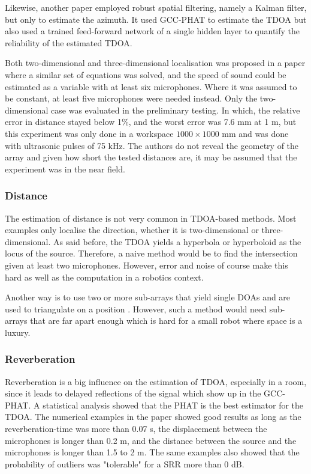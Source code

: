 \documentclass{report}
\begin{document}
Likewise, another paper \cite{kim_robust_2008} employed robust spatial filtering, namely a Kalman filter, but only to estimate the azimuth. It used GCC-PHAT to estimate the TDOA but also used a trained feed-forward network of a single hidden layer to quantify the reliability of the estimated TDOA. 

Both two-dimensional and three-dimensional localisation was proposed in a paper \cite{mahajan_3d_2001} where a similar set of equations was solved, and the speed of sound could be estimated as a variable with at least six microphones. Where it was assumed to be constant, at least five microphones were needed instead. Only the two-dimensional case was evaluated in the preliminary testing. In which, the relative error in distance stayed below 1\%, and the worst error was 7.6 \si{mm} at 1 \si{m}, but this experiment was only done in a workspace $1000\times 1000$ \si{mm} and was done with ultrasonic pulses of 75 \si{kHz}. The authors do not reveal the geometry of the array and given how short the tested distances are, it may be assumed that the experiment was in the near field.

\subsubsection{Distance}

The estimation of distance is not very common in TDOA-based methods. Most examples only localise the direction, whether it is two-dimensional or three-dimensional. As said before, the TDOA yields a hyperbola or hyperboloid as the locus of the source. Therefore, a naive method would be to find the intersection given at least two microphones. However, error and noise of course make this hard as well as the computation in a robotics context.

Another way is to use two or more sub-arrays that yield single DOAs and are used to triangulate on a position \cite{rascon_localization_2017}. However, such a method would need sub-arrays that are far apart enough which is hard for a small robot where space is a luxury.


\subsubsection{Reverberation}

Reverberation is a big influence on the estimation of TDOA, especially in a room, since it leads to delayed reflections of the signal which show up in the GCC-PHAT. A statistical analysis \cite{gustafsson_source_2003} showed that the PHAT is the best estimator for the TDOA. The numerical examples in the paper showed good results as long as the reverberation-time was more than 0.07 \si{s}, the displacement between the microphones is longer than 0.2 \si{m}, and the distance between the source and the microphones is longer than 1.5 to 2 \si{m}. The same examples also showed that the probability of outliers was "tolerable" for a SRR more than 0 \si{dB}.
\end{document}
